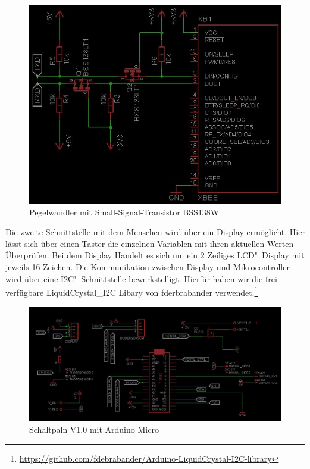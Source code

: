 \begin{figure}
	\centering
	\includegraphics[width=0.9\linewidth]{bilder/v1SchaltplanXbee.jpg}
	\caption{Pegelwandler mit Small-Signal-Transistor BSS138W }
	\label{fig-Pegel}
\end{figure}
		
Die zweite Schnittstelle mit dem Menschen wird über ein Display ermöglicht. 
Hier lässt sich über einen Taster die einzelnen Variablen mit ihren aktuellen Werten Überprüfen. 
Bei dem Display Handelt es sich um ein 2 Zeiliges LCD"~Display mit jeweils 16 Zeichen. 
Die Kommunikation zwischen Display und Mikrocontroller wird über eine I2C"~Schnittstelle bewerkstelligt. 
Hierfür haben wir die frei verfügbare \mbox{LiquidCrystal\_I2C} Libary von fderbrabander verwendet.\footnote{\href{https://github.com/fdebrabander/Arduino-LiquidCrystal-I2C-library}{https://github.com/fdebrabander/Arduino-LiquidCrystal-I2C-library}}

\begin{figure}[!h]
	\centering
	\includegraphics[width=0.9\linewidth]{bilder/v1SchaltplanMicro0.JPG}
	\caption{Schaltpaln V1.0 mit Arduino Micro}
	\label{fig-Schaltplanv1.0}
\end{figure}

